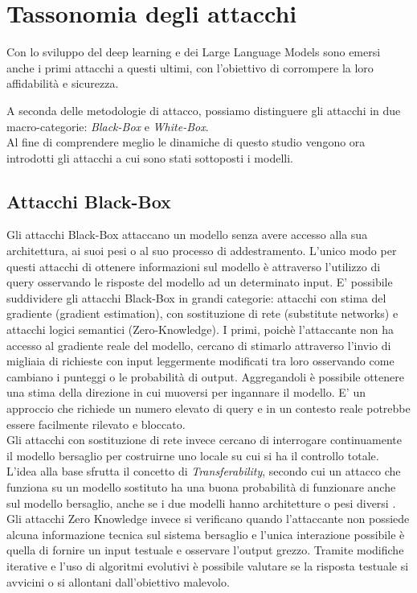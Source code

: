 \section{Tassonomia degli attacchi}
Con lo sviluppo del deep learning e dei Large Language Models sono emersi anche i primi attacchi a questi ultimi, con l'obiettivo di corrompere la loro affidabilità e sicurezza. 

A seconda delle metodologie di attacco, possiamo distinguere gli attacchi in due macro-categorie: \textit{Black-Box} e \textit{White-Box}.\\
Al fine di comprendere meglio le dinamiche di questo studio vengono ora introdotti gli attacchi a cui sono stati sottoposti i modelli.

\subsection{Attacchi Black-Box}
Gli attacchi Black-Box attaccano un modello senza avere accesso alla sua architettura, ai suoi pesi o al suo processo di addestramento. L'unico modo per questi attacchi di ottenere informazioni sul modello è attraverso l'utilizzo di query osservando le risposte del modello ad un determinato input.
E' possibile suddividere gli attacchi Black-Box in grandi categorie: attacchi con stima del gradiente (gradient estimation), con sostituzione di rete (substitute networks) e attacchi logici semantici (Zero-Knowledge).
I primi, poichè l'attaccante non ha accesso al gradiente reale del modello, cercano di stimarlo attraverso l'invio di migliaia di richieste con input leggermente modificati tra loro osservando come cambiano i punteggi o le probabilità di output. Aggregandoli è possibile ottenere una stima della direzione in cui muoversi per ingannare il modello. E' un approccio che richiede un numero elevato di query e in un contesto reale potrebbe essere facilmente rilevato e bloccato.\\
Gli attacchi con sostituzione di rete invece cercano di interrogare continuamente il modello bersaglio per costruirne uno locale su cui si ha il controllo totale.
L'idea alla base sfrutta il concetto di \textit{Transferability}, secondo cui un attacco che funziona su un modello sostituto ha una buona probabilità di funzionare anche sul modello bersaglio, anche se i due modelli hanno architetture o pesi diversi \cite{zhou2020adversarialeigenattackblackbox}.\\
Gli attacchi Zero Knowledge invece si verificano quando l'attaccante non possiede alcuna informazione tecnica sul sistema bersaglio e l'unica interazione possibile è quella di fornire un input testuale e osservare l'output grezzo. Tramite modifiche iterative e l'uso di algoritmi evolutivi è possibile valutare se la risposta testuale si avvicini o si allontani dall'obiettivo malevolo.

